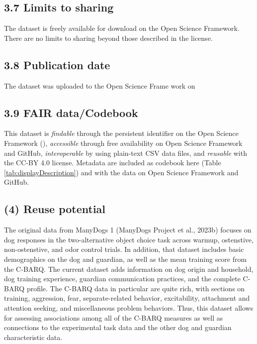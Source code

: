 \documentclass[
  man,floatsintext]{apa6}
\begin{document}
\hypertarget{limits-to-sharing}{%
\subsection{3.7 Limits to sharing}\label{limits-to-sharing}}

The dataset is freely available for download on the Open Science Framework. There are no limits to sharing beyond those described in the license.

\hypertarget{publication-date}{%
\subsection{3.8 Publication date}\label{publication-date}}

The dataset was uploaded to the Open Science Frame work on

\hypertarget{fair-datacodebook}{%
\subsection{3.9 FAIR data/Codebook}\label{fair-datacodebook}}

This dataset is \emph{findable} through the persistent identifier on the Open Science Framework (), \emph{accessible} through free availability on Open Science Framework and GitHub, \emph{interoperable} by using plain-text CSV data files, and \emph{reusable} with the CC-BY 4.0 license. Metadata are included as codebook here (Table \ref{tab:displayDescription}) and with the data on Open Science Framework and GitHub.

\hypertarget{reuse-potential}{%
\subsection{(4) Reuse potential}\label{reuse-potential}}

The original data from ManyDogs 1 (ManyDogs Project et al., 2023b) focuses on dog responses in the two-alternative object choice task across warmup, ostenstive, non-ostenstive, and odor control trials. In addition, that dataset includes basic demographics on the dog and guardian, as well as the mean training score from the C-BARQ. The current dataset adds information on dog origin and household, dog training experience, guardian communication practices, and the complete C-BARQ profile. The C-BARQ data in particular are quite rich, with sections on training, aggression, fear, separate-related behavior, excitability, attachment and attention seeking, and miscellaneous problem behaviors. Thus, this dataset allows for assessing associations among all of the C-BARQ measures as well as connections to the experimental task data and the other dog and guardian characteristic data.
\end{document}
